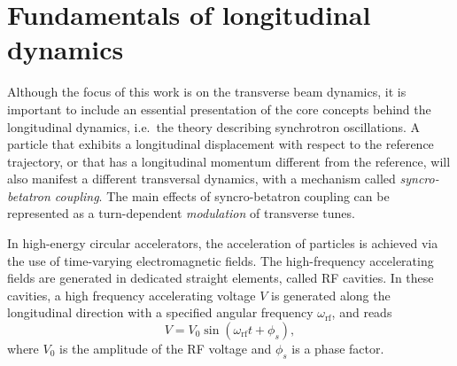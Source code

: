 
\section{Fundamentals of longitudinal dynamics}

Although the focus of this work is on the transverse beam dynamics, it is important to include an essential presentation of the core concepts behind the longitudinal dynamics, i.e.\ the theory describing synchrotron oscillations. A particle that exhibits a longitudinal displacement with respect to the reference trajectory, or that has a longitudinal momentum different from the reference, will also manifest a different transversal dynamics, with a mechanism called \textit{syncro-betatron coupling}. The main effects of syncro-betatron coupling can be represented as a turn-dependent \textit{modulation} of transverse tunes.

In high-energy circular accelerators, the acceleration of particles is achieved via the use of time-varying electromagnetic fields. The high-frequency accelerating fields are generated in dedicated straight elements, called RF cavities. In these cavities, a high frequency accelerating voltage $V$ is generated along the longitudinal direction with a specified angular frequency $\omega_{\mathrm{rf}}$, and reads
\begin{equation}
    V=V_0 \sin \left(\omega_{\mathrm{rf}} t+\phi_s\right),
\end{equation}
where $V_0$ is the amplitude of the RF voltage and $\phi_s$ is a phase factor.

